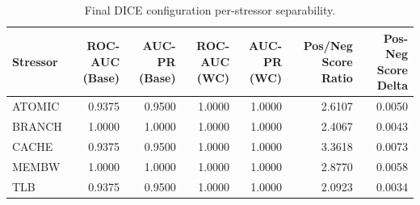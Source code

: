 \begin{table}[t]
\centering
\caption{Final DICE configuration per-stressor separability.}
\label{tab:dice_full_stressor}
\footnotesize
\begin{tabular}{lrrrrrr}
\toprule
Stressor & ROC-AUC (Base) & AUC-PR (Base) & ROC-AUC (WC) & AUC-PR (WC) & Pos/Neg Score Ratio & Pos-Neg Score Delta \\
\midrule
ATOMIC & 0.9375 & 0.9500 & 1.0000 & 1.0000 & 2.6107 & 0.0050 \\
BRANCH & 1.0000 & 1.0000 & 1.0000 & 1.0000 & 2.4067 & 0.0043 \\
CACHE & 0.9375 & 0.9500 & 1.0000 & 1.0000 & 3.3618 & 0.0073 \\
MEMBW & 1.0000 & 1.0000 & 1.0000 & 1.0000 & 2.8770 & 0.0058 \\
TLB & 0.9375 & 0.9500 & 1.0000 & 1.0000 & 2.0923 & 0.0034 \\
\bottomrule
\end{tabular}

\end{table}
